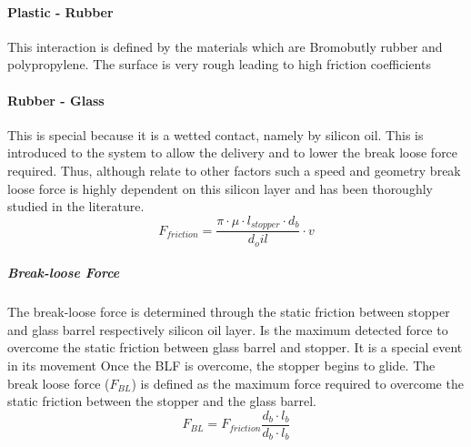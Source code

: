\paragraph{Plastic - Rubber}
This interaction is defined by the materials which are Bromobutly rubber and polypropylene.
The surface is very rough leading to high friction coefficients
\paragraph{Rubber - Glass}
This is special because it is a wetted contact, namely by silicon oil. This is introduced to the system to allow the delivery and to lower the break loose force required. Thus, although relate to other factors such a speed and geometry break loose force is highly dependent on this silicon layer and has been thoroughly studied in the literature.
\begin{equation}
F_{friction}=\frac{\pi \cdot \mu \cdot l_{stopper} \cdot d_b}{d_oil}\cdot v
\end{equation}

\subparagraph*{Break-loose Force} 	The break-loose force is determined through the static friction between stopper and glass barrel respectively silicon oil layer. Is the maximum detected force to overcome the static friction between glass barrel and stopper. It is a special event in its movement  Once the BLF is overcome, the stopper begins to glide.
The break loose force ($F_{BL}$) is defined as the maximum force required to overcome the static friction between the stopper and the glass barrel.
\begin{equation}
F_{BL}=F_{friction}\frac{d_{b} \cdot l_b}{d_{b} \cdot l_{b}}
\end{equation}


